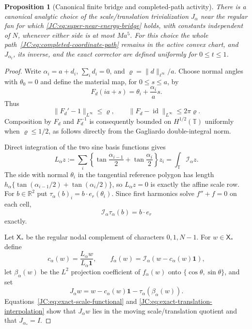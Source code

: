 \documentclass[11pt]{amsart}
\numberwithin{equation}{section}
\newtheorem{proposition}[theorem]{Proposition}
\theoremstyle{definition}
\theoremstyle{remark}
\begin{document}
\begin{proposition}[Canonical finite bridge and completed-path activity]
\label{JC:prop:super-near-bridge-active}
There is a canonical analytic choice of the scale/translation
trivialization $J_\alpha$ near the regular fan for which
\eqref{JC:eq:super-near-energy-bridge} holds, with constants independent of
$N$, whenever either side is at most $Ma^5$.  For this choice the whole
path~\eqref{JC:eq:completed-coordinate-path} remains in the active convex
chart, and $J_{\alpha_t}$, its inverse, and the exact corrector are defined
uniformly for $0\le t\le1$.
\end{proposition}

\begin{proof}
Write $\alpha_i=a+d_i$, $\sum_i d_i=0$, and
\(\varrho=\|d\|_{\ell^\infty}/a\).  Choose normal angles with
$\theta_0=0$ and define the material map, for $0\le s\le a$, by
\[
 F_d(ia+s)=\theta_i+\frac{\alpha_i}{a}s .
\]
Thus
\begin{equation}\label{JC:eq:material-map-small}
 \|F_d'-1\|_{L^\infty}\le\varrho,
 \qquad
 \|F_d-\operatorname{id}\|_{L^\infty}\le2\pi\varrho .
\end{equation}
Composition by $F_d$ and $F_d^{-1}$ is consequently bounded on
$H^{1/2}(\mathbb T)$ uniformly when $\varrho\le1/2$, as follows directly
from the Gagliardo double-integral norm.

Direct integration of the two sine basis functions gives
\begin{equation}\label{JC:eq:exact-scale-functional}
 L_\alpha z:=\sum_i\left\{
 \tan\frac{\alpha_{i-1}}2+\tan\frac{\alpha_i}2\right\}z_i
 =\int_{\mathbb T}\mathcal I_\alpha z .
\end{equation}
The side with normal $\theta_i$ in the tangential reference polygon has
length $h_\alpha\{\tan(\alpha_{i-1}/2)+\tan(\alpha_i/2)\}$, so
$L_\alpha z=0$ is exactly the affine scale row.  For $b\in\mathbb R^2$
put $\tau_\alpha(b)_i=b\cdot e_r(\theta_i)$.  Since first harmonics solve
$f''+f=0$ on each cell,
\begin{equation}\label{JC:eq:exact-translation-interpolation}
 \mathcal I_\alpha\tau_\alpha(b)=b\cdot e_r
\end{equation}
exactly.

Let $\mathsf X_*$ be the regular nodal complement of characters
$0,1,N-1$.  For $w\in\mathsf X_*$ define
\[
 c_\alpha(w)=\frac{L_\alpha w}{L_\alpha\mathbf1},
 \qquad
 f_\alpha(w)=\mathcal I_\alpha(w-c_\alpha(w)\mathbf1),
\]
let $\beta_\alpha(w)$ be the $L^2$ projection coefficient of $f_\alpha(w)$
onto $\{\cos\theta,\sin\theta\}$, and set
\begin{equation}\label{JC:eq:canonical-Jalpha}
 J_\alpha w=w-c_\alpha(w)\mathbf1-\tau_\alpha(\beta_\alpha(w)).
\end{equation}
Equations~\eqref{JC:eq:exact-scale-functional} and
\eqref{JC:eq:exact-translation-interpolation} show that $J_\alpha w$ lies
in the moving scale/translation quotient and that $J_{\alpha_*}=I$.


\end{proof}
\end{document}
